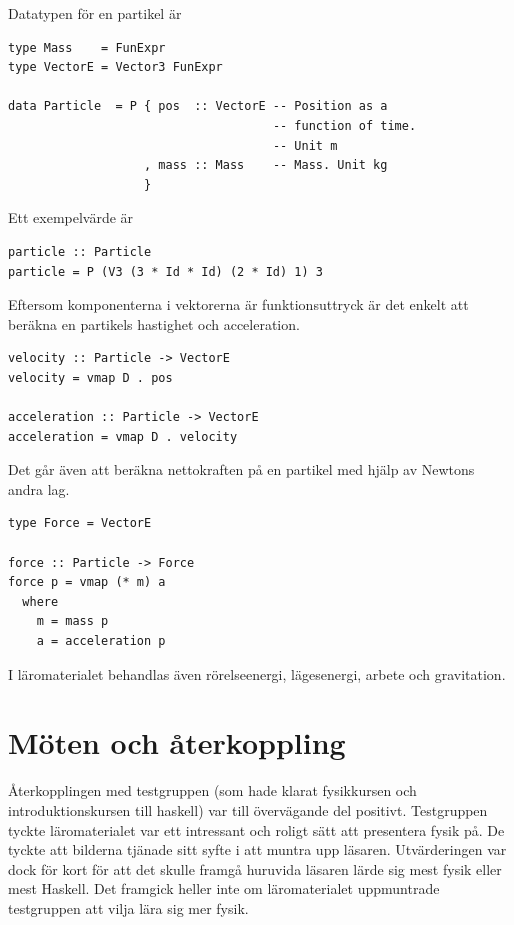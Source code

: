 Datatypen för en partikel är

\begin{lstlisting}
type Mass    = FunExpr
type VectorE = Vector3 FunExpr

data Particle  = P { pos  :: VectorE -- Position as a
                                     -- function of time.
                                     -- Unit m
                   , mass :: Mass    -- Mass. Unit kg
                   }
\end{lstlisting}

Ett exempelvärde är

\begin{lstlisting}
particle :: Particle
particle = P (V3 (3 * Id * Id) (2 * Id) 1) 3
\end{lstlisting}

Eftersom komponenterna i vektorerna är funktionsuttryck är det enkelt att beräkna en partikels hastighet och acceleration.

\begin{lstlisting}
velocity :: Particle -> VectorE
velocity = vmap D . pos

acceleration :: Particle -> VectorE
acceleration = vmap D . velocity
\end{lstlisting}

Det går även att beräkna nettokraften på en partikel med hjälp av Newtons andra lag.

\begin{lstlisting}
type Force = VectorE

force :: Particle -> Force
force p = vmap (* m) a
  where
    m = mass p
    a = acceleration p
\end{lstlisting}

I läromaterialet behandlas även rörelseenergi, lägesenergi, arbete och gravitation.

\section{Möten och återkoppling}\label{sec:res_test}

Återkopplingen med testgruppen (som hade klarat fysikkursen och 
introduktionskursen till haskell) var till övervägande del positivt.
Testgruppen tyckte läromaterialet var ett intressant och roligt sätt att
presentera fysik på. De tyckte att bilderna tjänade sitt syfte i att muntra upp
läsaren. Utvärderingen var dock för kort för att det skulle framgå huruvida läsaren lärde
sig mest fysik eller mest Haskell. Det framgick heller inte om läromaterialet
uppmuntrade testgruppen att vilja lära sig mer fysik.

